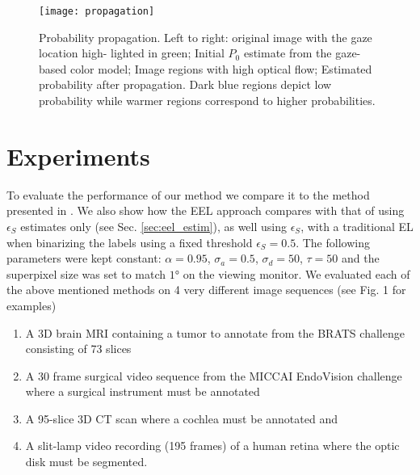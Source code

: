 \begin{figure}[h]
\texttt{[image: propagation]}
\caption{Probability propagation. Left to right: original image with the gaze location high-
lighted in green; Initial $P_{0}$ estimate from the gaze-based color model; Image regions with high
optical flow; Estimated probability after propagation. Dark blue regions depict low probability
while warmer regions correspond to higher probabilities.}
\label{fig:eel_propagation}
\end{figure}


\section{Experiments}
\label{sec:eel_exp}
To evaluate the performance of our method we compare it to the method presented in \cite{vilarino07}.
We also show how the EEL approach compares with that of using $\epsilon_{S}$ estimates only
(see Sec. \ref{sec:eel_estim}), as well using $\epsilon_{S}$, with a traditional EL when binarizing the labels using a fixed
threshold $\epsilon_{S}=0.5$.
The following parameters were kept constant: $\alpha=0.95$, $\sigma_{a}=0.5$, $\sigma_{d}=50$, $\tau = 50$ and the superpixel size was set to match $\ang{1}$ on the viewing monitor.
We evaluated each of the above mentioned methods on 4 very different image sequences (see
Fig. 1 for examples)

\begin{enumerate}
\item A 3D brain MRI containing a tumor to annotate from the BRATS
challenge \cite{BRATSChall} consisting of 73 slices
\item A 30 frame surgical video sequence from the MICCAI
EndoVision challenge \cite{endochal} where a surgical instrument must be annotated
\item A 95-slice 3D CT scan where a cochlea must be annotated and
\item A slit-lamp video recording (195 frames) of a human retina where the optic disk must be segmented.
\end{enumerate}


